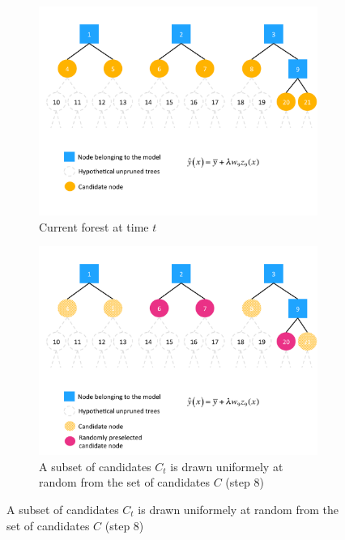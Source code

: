 \documentclass{article}
\begin{document}
\begin{figure}[ht]    
  \begin{subfigure}[b]{0.5\linewidth}
    \centering
    \includegraphics[height=0.25\textheight]{gif_algo1} 
    \caption{Current forest at time $t$} 
    \label{fig:gif-algo1} 
  \end{subfigure} 
  \hspace{\fill}  %
  \begin{subfigure}[b]{0.5\linewidth}
    \centering
    \includegraphics[height=0.25\textheight]{gif_algo2} 
    \caption{A subset of candidates $C_t$  is drawn uniformely at random from 
    the set of candidates $C$ (step 8)} 
    \label{fig:gif-algo2} 
  \end{subfigure} 


\end{figure}
\end{document}
